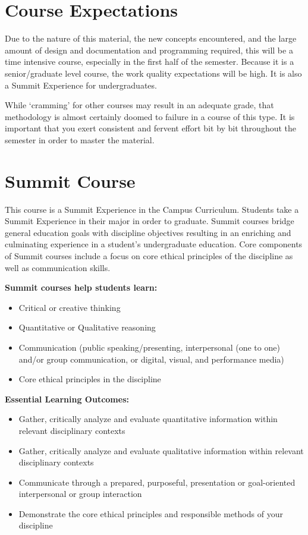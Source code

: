 \documentclass[11pt]{article}
\begin{document}
\section*{Course Expectations}

Due to the nature of this material, the new concepts encountered, and the large amount of design and documentation and programming required, this will be a time intensive course, especially in the first half of the semester. Because it is a senior/graduate level course, the work quality expectations will be high. It is also a Summit Experience for undergraduates.

While `cramming' for other courses may result in an adequate grade, that methodology is almost certainly doomed to failure in a course of this type. It is important that you exert consistent and fervent effort bit by bit throughout the semester in order to master the material.

\section*{Summit Course}

This course is a Summit Experience in the Campus Curriculum. Students take a Summit Experience in their major in order to graduate. Summit courses bridge general education goals with discipline objectives resulting in an enriching and culminating experience in a student's undergraduate education. Core components of Summit courses include a focus on core ethical principles of the discipline as well as communication skills.

\textbf{Summit courses help students learn:}
\begin{itemize}
    \item Critical or creative thinking
    \item Quantitative or Qualitative reasoning
    \item Communication (public speaking/presenting, interpersonal (one to one) and/or group communication, or digital, visual, and performance media)
    \item Core ethical principles in the discipline
\end{itemize}

\textbf{Essential Learning Outcomes:}
\begin{itemize}
    \item Gather, critically analyze and evaluate quantitative information within relevant disciplinary contexts
    \item Gather, critically analyze and evaluate qualitative information within relevant disciplinary contexts
    \item Communicate through a prepared, purposeful, presentation or goal-oriented interpersonal or group interaction
    \item Demonstrate the core ethical principles and responsible methods of your discipline
\end{itemize}
\end{document}
